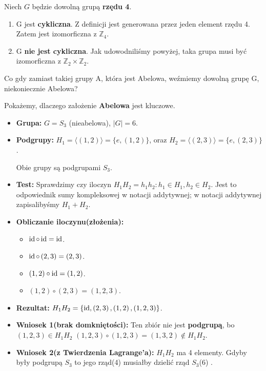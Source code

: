 \begin{corollary}
	Niech $G$ będzie dowolną grupą \textbf{rzędu 4}.
	\begin{enumerate}[label=\textbf{Przypadek \arabic*:}, wide]
		\item G jest \textbf{cykliczna}. Z definicji jest generowana przez jeden element rzędu 4. Zatem jest izomorficzna z $\mathbb{Z}_4$.
		\item G \textbf{nie jest cykliczna}. Jak udowodniliśmy powyżej, taka grupa musi być izomorficzna z $\mathbb{Z}_2\times \mathbb{Z}_2$.
	\end{enumerate}
\end{corollary}

\begin{question}
Co gdy zamiast takiej grupy A, która jest Abelowa, weźmiemy dowolną grupę G, niekoniecznie Abelowa?
\end{question}

\begin{eg}
	Pokażemy, dlaczego założenie \textbf{Abelowa} jest kluczowe.
	\begin{itemize}
		\item \textbf{Grupa: } $G = S_3$ (nieabelowa), $\left| G \right| = 6$.
		\item \textbf{Podgrupy: } $H_1 = \langle \left( 1,2 \right)  \rangle = \{e, \left( 1,2 \right) \} $, oraz $H_2 = \langle \left( 2,3 \right)  \rangle = \{e, \left( 2,3 \right) \}$.

			Obie grupy są podgrupami $S_3$.
		\item \textbf{Test: } Sprawdzimy czy iloczyn $H_1H_2 = h_1h_2: h_1\in H_1, h_2 \in H_2$. Jest to odpowiednik sumy kompleksowej w notacji addytywnej; w notacji addytywnej zapisalibyśmy $H_1+H_2$. 
		\item \textbf{Obliczanie iloczynu(złożenia): }
			\begin{itemize}
				\item $\operatorname{id} \circ \operatorname{id} = \operatorname{id}$.
				\item $\operatorname{id} \circ \left( 2,3\right) = \left( 2,3 \right) $.
				\item $\left( 1,2 \right) \circ \operatorname{id} = \left( 1,2 \right) $.
				\item $\left( 1,2 \right) \circ \left( 2,3 \right) = \left( 1,2,3 \right) $.
			\end{itemize}
		\item \textbf{Rezultat: } $H_1H_2 = \{\operatorname{id}, \left( 2,3 \right), \left( 1,2 \right), \left( 1,2,3 \right) \} $.
		\item \textbf{Wniosek 1(brak domkniętości): } Ten zbiór nie jest \textbf{podgrupą}, bo $\left( 1,2,3 \right) \in H_1H_2$ $\left( 1,2,3 \right) \circ \left( 1,2,3 \right) = \left( 1,3,2 \right) \not\in H_1H_2$.
		\item \textbf{Wniosek 2(z Twierdzenia Lagrange'a): } $H_1H_2$ ma 4 elementy. Gdyby były podgrupą $S_3$ to jego rząd(4) musiałby dzielić rząd $S_3$(6) .
	\end{itemize}
\end{eg}

